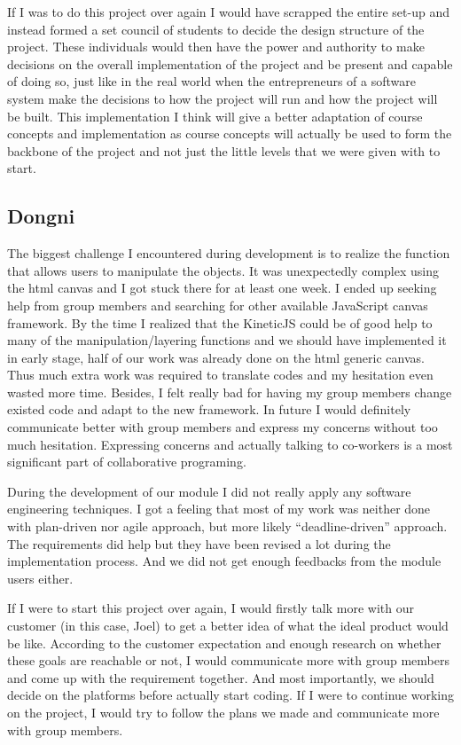 \documentclass[a4paper, 11pt]{article} %
\begin{document}
If I was to do this project over again I would have scrapped the entire set-up and instead formed a set council of students to decide the design structure of the project. These individuals would then have the power and authority to make decisions on the overall implementation of the project and be present and capable of doing so, just like in the real world when the entrepreneurs of a software system make the decisions to how the project will run and how the project will be built. This implementation I think will give a better adaptation of course concepts and implementation as course concepts will actually be used to form the backbone of the project and not just the little levels that we were given with to start. 


\subsection{Dongni}
The biggest challenge I encountered during development is to realize the function that allows users to manipulate the objects. It was unexpectedly complex using the html canvas and I got stuck there for at least one week. I ended up seeking help from group members and searching for other available JavaScript canvas framework. By the time I realized that the KineticJS could be of good help to many of the manipulation/layering functions and we should have implemented it in early stage, half of our work was already done on the html generic canvas. Thus much extra work was required to translate codes and my hesitation even wasted more time. Besides, I felt really bad for having my group members change existed code and adapt to the new framework. In future I would definitely communicate better with group members and express my concerns without too much hesitation. Expressing concerns and actually talking to co-workers is a most significant part of collaborative programing.

During the development of our module I did not really apply any software engineering techniques. I got a feeling that most of my work was neither done with plan-driven nor agile approach, but more likely “deadline-driven” approach. The requirements did help but they have been revised a lot during the implementation process. And we did not get enough feedbacks from the module users either. 

If I were to start this project over again, I would firstly talk more with our customer (in this case, Joel) to get a better idea of what the ideal product would be like. According to the customer expectation and enough research on whether these goals are reachable or not, I would communicate more with group members and come up with the requirement together. And most importantly, we should decide on the platforms before actually start coding. If I were to continue working on the project, I would try to follow the plans we made and communicate more with group members.
\end{document}
